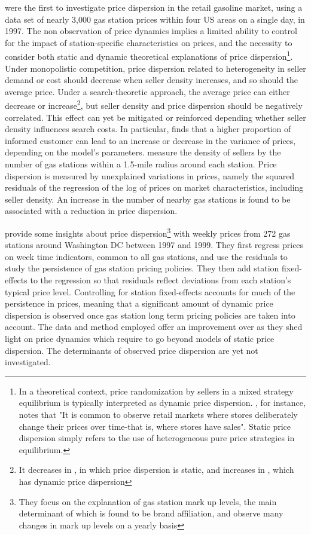 \documentclass[english]{article}
\begin{document}
\cite{BAR04} were the first to investigate price dispersion in the retail gasoline market, using a data set of nearly 3,000 gas station prices within four US areas on a single day, in 1997. The non observation of price dynamics implies a limited ability to control for the impact of station-specific characteristics on prices, and the necessity to consider both static and dynamic theoretical explanations of price dispersion\footnote{In a theoretical context, price randomization by sellers in a mixed strategy equilibrium is typically interpreted as dynamic price dispersion. \cite{VAR80}, for instance, notes that "It is common to observe retail markets where stores deliberately change their prices over time-that is, where stores have sales". Static price dispersion simply refers to the use of heterogeneous pure price strategies in equilibrium.}. Under monopolistic competition, price dispersion related to heterogeneity in seller demand or cost should decrease when seller density increases, and so should the average price. Under a search-theoretic approach, the average price can either decrease or increase\footnote{It decreases in \cite{CAR83}, in which price dispersion is static, and increases in \cite{VAR80}, which has dynamic price dispersion}, but  seller density and price dispersion should be negatively correlated. This effect can yet be mitigated or reinforced depending whether seller density influences search costs. In particular, \cite{VAR80} finds that a higher proportion of informed customer can lead to an increase or decrease in the variance of prices, depending on the model's parameters. \cite{BAR04} measure the density of sellers by the number of gas stations within a 1.5-mile radius around each station. Price dispersion is measured by unexplained variations in prices, namely the squared residuals of the regression of the log of prices on market characteristics, including seller density. An increase in the number of nearby gas stations is found to be associated with a reduction in price dispersion.

\cite{HOS08} provide some insights about price dispersion\footnote{They focus on the explanation of gas station mark up levels, the main determinant of which is found to be brand affiliation, and observe many changes in mark up levels  on a yearly basis} with weekly prices from 272 gas stations around Washington DC  between 1997 and 1999. They first regress prices on week time indicators, common to all gas stations, and use the residuals to study the persistence of gas station pricing policies. They then add station fixed-effects to the regression so that residuals reflect deviations from each station's typical price level. Controlling for station fixed-effects accounts for much of the persistence in prices, meaning that a significant amount of dynamic price dispersion is observed once gas station long term pricing policies are taken into account.  The data and method employed offer an improvement over \cite{BAR04} as they shed light on price dynamics which require to go beyond models of static price dispersion. The determinants of observed price dispersion are yet not investigated.
\end{document}
